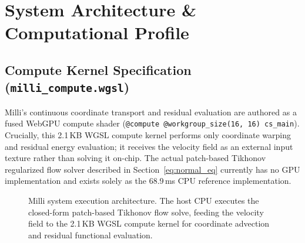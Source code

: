 \documentclass[11pt]{article}
\begin{document}
\section{System Architecture \& Computational Profile}

\subsection{Compute Kernel Specification (\texttt{milli\_compute.wgsl})}

Milli's continuous coordinate transport and residual evaluation are authored as a fused WebGPU compute shader (\texttt{@compute @workgroup\_size(16, 16) cs\_main}). Crucially, this 2.1\,KB WGSL compute kernel performs only coordinate warping and residual energy evaluation; it receives the velocity field as an external input texture rather than solving it on-chip. The actual patch-based Tikhonov regularized flow solver described in Section~\ref{eq:normal_eq} currently has no GPU implementation and exists solely as the 68.9\,ms CPU reference implementation.

\begin{figure}[t]
\centering
{}
\caption{Milli system execution architecture. The host CPU executes the closed-form patch-based Tikhonov flow solve, feeding the velocity field to the 2.1\,KB WGSL compute kernel for coordinate advection and residual functional evaluation.}
\label{fig:milli_arch}
\end{figure}
\end{document}
